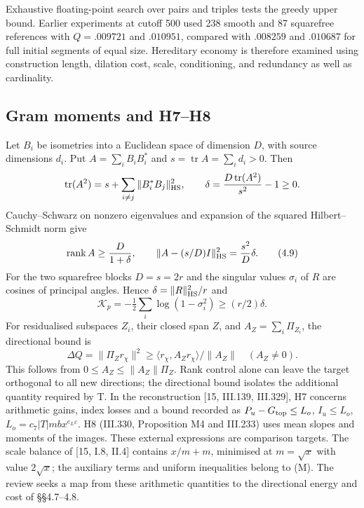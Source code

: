 \documentclass[11pt,a4paper]{article}
\begin{document}
Exhaustive floating-point search over pairs and triples tests the greedy upper bound. Earlier experiments at cutoff 500 used 238 smooth and 87 squarefree references with $Q=.009721$ and $.010951$, compared with $.008259$ and $.010687$ for full initial segments of equal size. Hereditary economy is therefore examined using construction length, dilation cost, scale, conditioning, and redundancy as well as cardinality.
\subsection{Gram moments and H7--H8}
Let $B_i$ be isometries into a Euclidean space of dimension $D$, with source dimensions $d_i$. Put $A=\sum_iB_iB_i^*$ and $s=\operatorname{tr}A=\sum_i d_i>0$. Then
\[\operatorname{tr}(A^2)=s+\sum_{i\ne j}\|B_i^*B_j\|_{\rm HS}^2,\qquad \delta=\frac{D\operatorname{tr}(A^2)}{s^2}-1\ge0.\]
Cauchy--Schwarz on nonzero eigenvalues and expansion of the squared Hilbert--Schmidt norm give
\[\operatorname{rank} A\ge\frac{D}{1+\delta},\qquad \|A-(s/D)I\|_{\rm HS}^2=\frac{s^2}{D}\delta.\tag{4.9}\]
For the two squarefree blocks $D=s=2r$ and the singular values $\sigma_i$ of $R$ are cosines of principal angles. Hence $\delta=\|R\|_{\rm HS}^2/r$ and
\[\mathcal K_p=-\tfrac12\sum_i\log(1-\sigma_i^2)\ge(r/2)\delta.\]
For residualised subspaces $Z_i$, their closed span $Z$, and $A_Z=\sum_i\Pi_{Z_i}$, the directional bound is
\[\Delta Q=\|\Pi_Zr_\chi\|^2\ge\langle r_\chi,A_Zr_\chi\rangle/\|A_Z\|\quad(A_Z\ne0).\]
This follows from $0\le A_Z\le\|A_Z\|\Pi_Z$. Rank control alone can leave the target orthogonal to all new directions; the directional bound isolates the additional quantity required by T.
In the reconstruction [15, III.139, III.329], H7 concerns arithmetic gains, index losses and a bound recorded as $P_u-G_{\rm top}\le L_o$, $I_u\le L_o$, $L_o=c_7|T|mbx^{e_L\varepsilon}$. H8 (III.330, Proposition M4 and III.233) uses mean slopes and moments of the images. These external expressions are comparison targets. The scale balance of [15, I.8, II.4] contains $x/m+m$, minimised at $m=\sqrt x$ with value $2\sqrt x$; the auxiliary terms and uniform inequalities belong to (M). The review seeks a map from these arithmetic quantities to the directional energy and cost of §§4.7--4.8.
\end{document}
